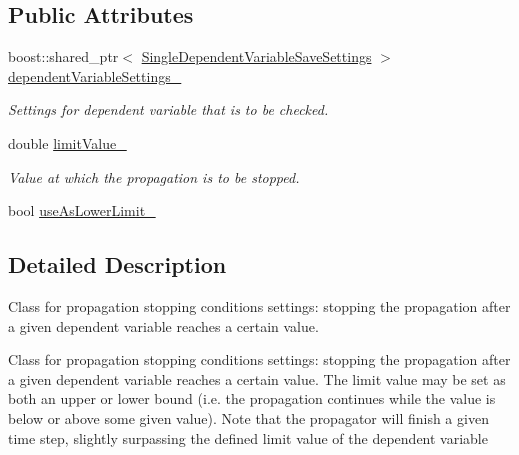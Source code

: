 \subsection*{Public Attributes}
\begin{DoxyCompactItemize}
\item 
boost\+::shared\+\_\+ptr$<$ \hyperlink{classtudat_1_1propagators_1_1SingleDependentVariableSaveSettings}{Single\+Dependent\+Variable\+Save\+Settings} $>$ \hyperlink{classtudat_1_1propagators_1_1PropagationDependentVariableTerminationSettings_a5f33debc47d9d81936322a1601bc0f75}{dependent\+Variable\+Settings\+\_\+}\hypertarget{classtudat_1_1propagators_1_1PropagationDependentVariableTerminationSettings_a5f33debc47d9d81936322a1601bc0f75}{}\label{classtudat_1_1propagators_1_1PropagationDependentVariableTerminationSettings_a5f33debc47d9d81936322a1601bc0f75}

\begin{DoxyCompactList}\small\item\em Settings for dependent variable that is to be checked. \end{DoxyCompactList}\item 
double \hyperlink{classtudat_1_1propagators_1_1PropagationDependentVariableTerminationSettings_abd20020a0d0c71c95073ec55a77f7116}{limit\+Value\+\_\+}\hypertarget{classtudat_1_1propagators_1_1PropagationDependentVariableTerminationSettings_abd20020a0d0c71c95073ec55a77f7116}{}\label{classtudat_1_1propagators_1_1PropagationDependentVariableTerminationSettings_abd20020a0d0c71c95073ec55a77f7116}

\begin{DoxyCompactList}\small\item\em Value at which the propagation is to be stopped. \end{DoxyCompactList}\item 
bool \hyperlink{classtudat_1_1propagators_1_1PropagationDependentVariableTerminationSettings_a7dc06eb4a8f0134d458185ef9d54a878}{use\+As\+Lower\+Limit\+\_\+}
\end{DoxyCompactItemize}


\subsection{Detailed Description}
Class for propagation stopping conditions settings\+: stopping the propagation after a given dependent variable reaches a certain value.

Class for propagation stopping conditions settings\+: stopping the propagation after a given dependent variable reaches a certain value. The limit value may be set as both an upper or lower bound (i.\+e. the propagation continues while the value is below or above some given value). Note that the propagator will finish a given time step, slightly surpassing the defined limit value of the dependent variable 


